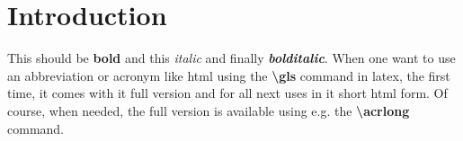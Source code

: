 \documentclass[11pt,a4paper,oneside,article]{memoir}
\begin{document}
\pagestyle{empty} %
\tableofcontents*
\pagestyle{empty} %


\clearpage






\newpage

\pagestyle{plain}

\setcounter{page}{1} %
\ClearWallPaper

\sloppy %

\chapter{Introduction}
This should be \textbf{bold} and this \textit{italic} and finally \textbf{\textit{bolditalic}}. When one want to use an abbreviation or acronym like \gls{html} using the \textbf{\textbackslash{}gls} command in \gls{latex}, the first time, it comes with it full version and for all next uses in it short \gls{html} form. Of course, when needed, the full version is available using e.g. the \textbf{\textbackslash{}acrlong} command.
\end{document}
